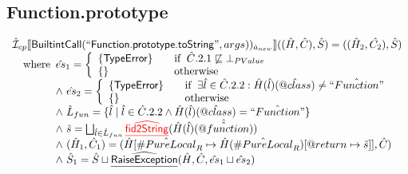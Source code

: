 \documentclass{article}
\makeatletter
\newcommand{\SF}[1]{\mbox{\textsf{#1}}}
\newcommand{\wherec}[1]{{\rm where}\begin{array}[t]{l}#1\end{array}}
\newcommand{\ifc}[1]{{\rm if}\begin{array}[t]{l}#1\end{array}}
\newcommand{\owc}{{\rm otherwise}}
\newcommand{\aI}{\hat{\mathcal{I}}}
\newcommand{\lbr}{\llbracket}
\newcommand{\rbr}{\rrbracket}
\newcommand{\ahf}[1]{\widehat{\underline{\sf #1}}}
\newcommand{\varprop}[1]{@#1}
\newcommand{\avarloc}[1]{\hat{\##1}}
\newcommand{\avarprop}[1]{\hat{@#1}}
\def\inred{\color{red}}
\def\inred{\color{red}}
\makeatother
\begin{document}
\subsection{Function.prototype}
\[
\begin{array}{l}
\aI _{cp}\lbr \SF{BuiltintCall}(``\SF{Function.prototype.toString}",args))_{\hat{a}_{new}}\rbr((\hat{H},\hat{C}), \hat{S})
  = ((\hat{H}_2, \hat{C_2}), \hat{S})\\
\quad\wherec{
  \hat{es}_1 =
    \left\{
    \begin{array}{l@{\quad\quad}l}
      \{ \SF{TypeError} \} & \ifc{\hat{C}.2.1 \not\sqsubseteq \bot_{PValue}}\\
      \{ \}& \owc\\
    \end{array}
    \right.\\
  \land\ \hat{es}_2 =
    \left\{
    \begin{array}{l@{\quad\quad}l}
      \{ \SF{TypeError} \}
      & \ifc{\exists \hat{l} \in \hat{C}.2.2: \hat{H}(\hat{l})(\avarprop{class})\neq \hat{``Function"}}\\
      \{ \}& \owc\\
    \end{array}
    \right.\\
  \land\ \hat{L}_{fun} = \{\hat{l} \mid \hat{l} \in \hat{C}.2.2 \land \hat{H}(\hat{l})(\avarprop{class}) =  \hat{``Function"}\}\\
  \land\ \hat{s} = \bigsqcup_{\hat{l} \in \hat{L}_{fun}}
    {\inred \ahf{fid2String}}(\hat{H}(\hat{l})(\hat{\avarprop{function}}))\\
  \land\ (\hat{H}_1, \hat{C}_1) = 
      (\hat{H}[\avarloc{PureLocal}_R \mapsto \hat{H}(\avarloc{PureLocal}_R)[\varprop{return} \mapsto \hat{s}]], \hat{C})\\
  \land\ \hat{S}_1 = \hat{S} \sqcup \ahf{RaiseException}(\hat{H}, \hat{C}, \hat{es}_1 \sqcup \hat{es}_2)\\
  }\\
\\\\




\end{array}\]
\end{document}
